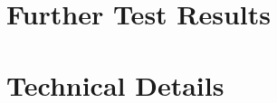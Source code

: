 \documentclass[./main.tex]{subfiles}
\begin{document}
\section{Further Test Results}

\section{Technical Details}
\end{document}

